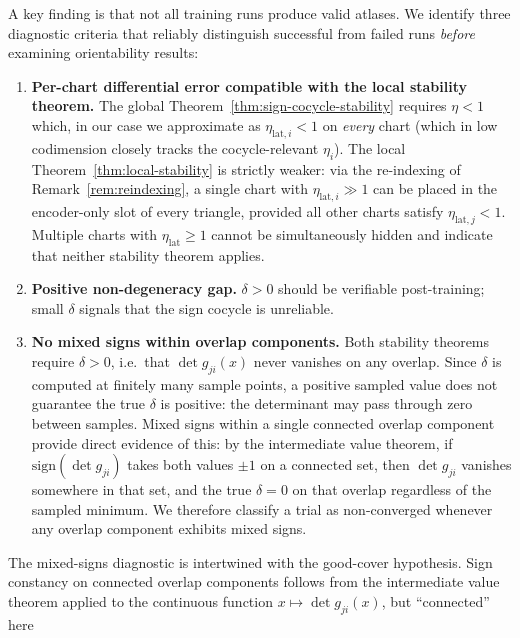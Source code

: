 \documentclass[11pt]{article}
\theoremstyle{plain}
\theoremstyle{definition}
\theoremstyle{remark}
\begin{document}
A key finding is that not all training runs produce valid 
atlases. We identify three diagnostic criteria that reliably 
distinguish successful from failed runs \emph{before} 
examining orientability results:
\begin{enumerate}
    \item \textbf{Per-chart differential error compatible 
    with the local stability theorem.}  The global 
    Theorem~\ref{thm:sign-cocycle-stability} requires $\eta<1$ which, in our case we approximate as 
    $\eta_{\mathrm{lat},i} < 1$ on \emph{every} chart (which in low codimension closely tracks the cocycle-relevant $\eta_i$).  
    The local Theorem~\ref{thm:local-stability} is 
    strictly weaker: via the re-indexing of 
    Remark~\ref{rem:reindexing}, a single chart with 
    $\eta_{\mathrm{lat},i} \gg 1$ can be placed in the 
    encoder-only slot of every triangle, provided all 
    other charts satisfy $\eta_{\mathrm{lat},j} < 1$.  
    Multiple charts with $\eta_{\mathrm{lat}} \geq 1$ 
    cannot be simultaneously hidden and indicate that 
    neither stability theorem applies.
    
    \item \textbf{Positive non-degeneracy gap.} $\delta > 0$ 
    should be verifiable post-training; small $\delta$ 
    signals that the sign cocycle is unreliable.
    
    \item \textbf{No mixed signs within overlap components.}  
    Both stability theorems require $\delta > 0$, i.e.\ that 
    $\det g_{ji}(x)$ never vanishes on any overlap.  Since 
    $\delta$ is computed at finitely many sample points, a 
    positive sampled value does not guarantee the true 
    $\delta$ is positive: the determinant may pass through 
    zero between samples.  Mixed signs within a single 
    connected overlap component provide direct evidence of 
    this: by the intermediate value theorem, if 
    $\mathrm{sign}(\det g_{ji})$ takes both values $\pm 1$ 
    on a connected set, then $\det g_{ji}$ vanishes 
    somewhere in that set, and the true $\delta = 0$ on 
    that overlap regardless of the sampled minimum.  We 
    therefore classify a trial as non-converged whenever 
    any overlap component exhibits mixed signs.
\end{enumerate}
The mixed-signs diagnostic is intertwined with the 
    good-cover hypothesis.  Sign constancy on connected 
    overlap components follows from the intermediate value 
    theorem applied to the continuous function 
    $x \mapsto \det g_{ji}(x)$, but ``connected'' here 
\end{document}
